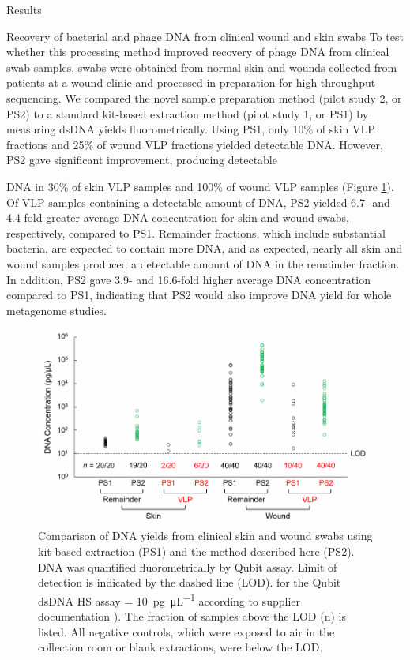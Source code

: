 \documentclass[oneside,12pt,final]{sty/ucthesis-CA2012}
\begin{document}
\begin{mainmatter}
\begin{section}{Results}
\begin{subsection}{Recovery of bacterial and phage DNA from clinical wound and skin swabs}
To test whether this processing method improved recovery of phage DNA from clinical swab samples, swabs were obtained from normal skin and wounds collected from patients at a wound clinic and processed in preparation for high throughput sequencing. We compared the novel sample preparation method (pilot study 2, or PS2) to a standard kit-based extraction method (pilot study 1, or PS1) by measuring dsDNA yields fluorometrically. Using PS1, only 10\% of skin VLP fractions and 25\% of wound VLP fractions yielded detectable DNA. However, PS2 gave significant improvement, producing detectable

DNA in 30\% of skin VLP samples and 100\% of wound VLP samples (Figure \ref{fig:yieldcomp}). Of VLP samples containing a detectable amount of DNA, PS2 yielded 6.7- and 4.4-fold greater average DNA concentration for skin and wound swabs, respectively, compared to PS1. Remainder fractions, which include substantial bacteria, are expected to contain more DNA, and as expected, nearly all skin and wound samples produced a detectable amount of DNA in the remainder fraction. In addition, PS2 gave 3.9- and 16.6-fold higher average DNA concentration compared to PS1, indicating that PS2 would also improve DNA yield for whole metagenome studies.

\begin{figure}
\centering
\includegraphics[width=\textwidth]{fig/C2fig6.pdf}
\caption{Comparison of DNA yields from clinical skin and wound swabs using kit-based extraction (PS1) and the method described here (PS2). DNA was quantified fluorometrically by Qubit assay. Limit of detection is indicated by the dashed line (LOD). for the Qubit dsDNA HS assay = \SI{10}{\pico\gram\per\micro\liter} according to supplier documentation \cite{RN85}). The fraction of samples above the LOD (n) is listed. All negative controls, which were exposed to air in the collection room or blank extractions, were below the LOD.}
\label{fig:yieldcomp}
\end{figure}


\end{subsection}
\end{section}
\end{mainmatter}
\end{document}

